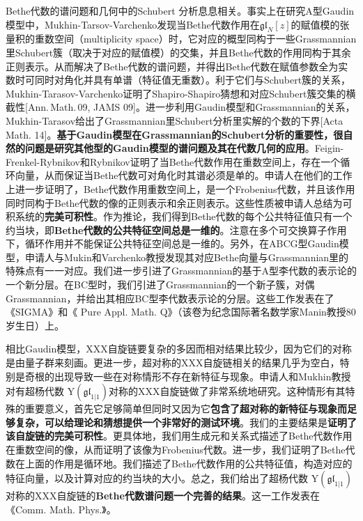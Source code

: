 \documentclass[12pt,UTF8,AutoFakeBold=4,a4paper]{ctexart}
\begin{document}
Bethe代数的谱问题和几何中的Schubert 分析息息相关。事实上在研究A型Gaudin模型中，Mukhin-Tarsov-Varchenko发现当Bethe代数作用在$\mathfrak{gl}_N[z]$的赋值模的张量积的重数空间（multiplicity space）时，它对应的概型同构于一些Grassmannian里Schubert簇（取决于对应的赋值模）的交集，并且Bethe代数的作用同构于其余正则表示。从而解决了Bethe代数的谱问题，并得出Bethe代数在赋值参数全为实数时可同时对角化并具有单谱（特征值无重数）。利于它们与Schubert簇的关系，Mukhin-Tarasov-Varchenko证明了Shapiro-Shapiro猜想和对应Schubert簇交集的横截性[Ann.\,Math.\,09, JAMS 09]。进一步利用Gaudin模型和Grassmannian的关系，Mukhin-Tarasov给出了Grassmannian里Schubert分析里实解的个数的下界[Acta Math. 14]。\textbf{基于Gaudin模型在Grassmannian的Schubert分析的重要性，很自然的问题是研究其他型的Gaudin模型的谱问题及其在代数几何的应用}。Feigin-Frenkel-Rybnikov和Rybnikov证明了当Bethe代数作用在重数空间上，存在一个循环向量，从而保证当Bethe代数可对角化时其谱必须是单的。申请人在他们的工作上进一步证明了，Bethe代数作用重数空间上，是一个Frobenius代数，并且该作用同时同构于Bethe代数的像的正则表示和余正则表示。这些性质被申请人总结为可积系统的\textbf{完美可积性}。作为推论，我们得到Bethe代数的每个公共特征值只有一个约当块，即\textbf{Bethe代数的公共特征空间总是一维的}。注意在多个可交换算子作用下，循环作用并不能保证公共特征空间总是一维的。另外，在ABCG型Gaudin模型，申请人与Mukin和Varchenko教授发现其对应Bethe向量与Grassmannian里的特殊点有一一对应。我们进一步引进了Grassmannian的基于A型李代数的表示论的一个新分层。在BC型时，我们引进了Grassmannian的一个新子簇，对偶Grassmannian，并给出其相应BC型李代数表示论的分层。这些工作发表在了《SIGMA》和《 Pure Appl. Math. Q》（该卷为纪念国际著名数学家Manin教授80岁生日）上。

相比Gaudin模型，XXX自旋链要复杂的多因而相对结果比较少，因为它们的对称是由量子群来刻画。更进一步，超对称的XXX自旋链相关的结果几乎为空白，特别是奇根的出现导致一些在对称情形不存在新特征与现象。申请人和Mukhin教授对有超杨代数 $\mathrm{Y}(\mathfrak{gl}_{1|1})$对称的XXX自旋链做了非常系统地研究。这种情形有其特殊的重要意义，首先它足够简单但同时又因为它\textbf{包含了超对称的新特征与现象而足够复杂，可以给理论和猜想提供一个非常好的测试环境}。我们的主要结果是\textbf{证明了该自旋链的完美可积性}。更具体地，我们用生成元和关系式描述了Bethe代数作用在重数空间的像，从而证明了该像为Frobenius代数。进一步，我们证明了Bethe代数在上面的作用是循环地。我们描述了Bethe代数作用的公共特征值，构造对应的特征向量，以及计算对应的约当块的大小。总之，我们给出了超杨代数 $\mathrm{Y}(\mathfrak{gl}_{1|1})$对称的XXX自旋链的\textbf{Bethe代数谱问题一个完善的结果}。这一工作发表在《Comm. Math. Phys.》。
\end{document}
